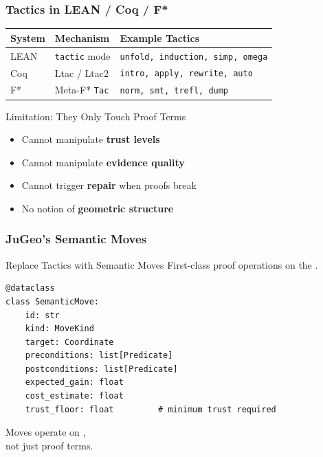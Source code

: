 \begin{frame}
\frametitle{Tactics in LEAN / Coq / F*}
\begin{center}
\small
\begin{tabular}{lll}
\toprule
\textbf{System} & \textbf{Mechanism} & \textbf{Example Tactics}\\
\midrule
LEAN   & \texttt{tactic} mode    & \texttt{unfold, induction, simp, omega}\\
Coq    & Ltac / Ltac2            & \texttt{intro, apply, rewrite, auto}\\
F*     & Meta-F* \texttt{Tac}    & \texttt{norm, smt, trefl, dump}\\
\bottomrule
\end{tabular}
\end{center}
\vspace{8pt}
\begin{alertblock}{Limitation: They Only Touch Proof Terms}
  \begin{itemize}
    \item Cannot manipulate \textcolor{jugeoRed}{\textbf{trust levels}}
    \item Cannot manipulate \textcolor{jugeoRed}{\textbf{evidence quality}}
    \item Cannot trigger \textcolor{jugeoRed}{\textbf{repair}} when proofs break
    \item No notion of \textcolor{jugeoRed}{\textbf{geometric structure}}
  \end{itemize}
\end{alertblock}
\end{frame}

\begin{frame}[fragile]
\frametitle{JuGeo's Semantic Moves}
\begin{exampleblock}{Replace Tactics with Semantic Moves}
  First-class proof operations on the .
\end{exampleblock}
\vspace{4pt}
\begin{lstlisting}
@dataclass
class SemanticMove:
    id: str
    kind: MoveKind
    target: Coordinate
    preconditions: list[Predicate]
    postconditions: list[Predicate]
    expected_gain: float
    cost_estimate: float
    trust_floor: float         # minimum trust required
\end{lstlisting}
\vfill
\begin{center}
\small
Moves operate on ,\\
not just proof terms.
\end{center}
\end{frame}

